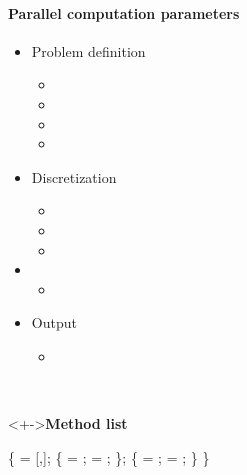 
\begin{frame}[fragile] 
\secframetitle{\ssParameters}
 \framesubtitle{Parallel computation parameters}
\vspace{-0.2in}
\begin{minipage}[t]{1.80in}
\begin{itemize}
\item Problem definition
  \begin{itemize}
  \item {}
  \item {}
  \item {}
  \item {}
  \end{itemize}
\item Discretization
  \begin{itemize}
  \item {}
  \item {}
  \item {}
  \end{itemize}
\item {}
  \begin{itemize}
  \item {}
  \end{itemize}
\item Output
  \begin{itemize}
    \item {}
  \end{itemize}
\end{itemize}
\end{minipage} \
\begin{minipage}[t]{2.50in}
\vspace{-0.2in}
 \begin{block}<+->{\textbf{Method list}}
 \footnotesize \vspace{-0.1in}
\begin{semiverbatim}
 \{
    = [,];
   \subgroup{ppm} \{
         = ;
        = \valuetext{true};
   \};
    \{
       = ;
        = ;
   \}
\}
\end{semiverbatim}
\end{block}
\end{minipage}
\end{frame}

